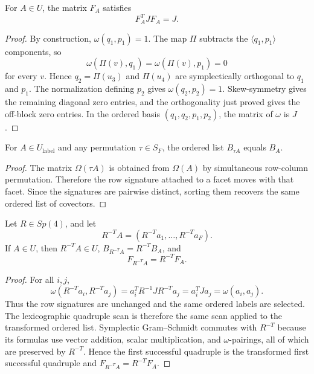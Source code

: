 \begin{lemma}
\label{lem:generic-coordinate-frame-symplectic}
For \(A\in U\), the matrix \(F_A\) satisfies
\[
  F_A^TJF_A=J.
\]
\end{lemma}

\begin{proof}
By construction, \(\omega(q_1,p_1)=1\). The map \(\Pi\) subtracts the
\(\langle q_1,p_1\rangle\) components, so
\[
  \omega(\Pi(v),q_1)=\omega(\Pi(v),p_1)=0
\]
for every \(v\). Hence \(q_2=\Pi(u_3)\) and \(\Pi(u_4)\) are symplectically
orthogonal to \(q_1\) and \(p_1\). The normalization defining \(p_2\) gives
\(\omega(q_2,p_2)=1\). Skew-symmetry gives the remaining diagonal zero entries,
and the orthogonality just proved gives the off-block zero entries. In the
ordered basis \((q_1,q_2,p_1,p_2)\), the matrix of \(\omega\) is \(J\).
\end{proof}

\begin{lemma}
\label{lem:generic-coordinate-labeling-permutation-equivariant}
For \(A\in U_{\mathrm{label}}\) and any permutation \(\tau\in S_F\), the ordered
list \(B_{\tau A}\) equals \(B_A\).
\end{lemma}

\begin{proof}
The matrix \(\Omega(\tau A)\) is obtained from \(\Omega(A)\) by simultaneous
row-column permutation. Therefore the row signature attached to a facet moves
with that facet. Since the signatures are pairwise distinct, sorting them
recovers the same ordered list of covectors.
\end{proof}

\begin{lemma}
\label{lem:generic-coordinate-frame-symplectic-equivariant}
Let \(R\in Sp(4)\), and let
\[
  R^{-T}A=(R^{-T}a_1,\ldots,R^{-T}a_F).
\]
If \(A\in U\), then \(R^{-T}A\in U\), \(B_{R^{-T}A}=R^{-T}B_A\), and
\[
  F_{R^{-T}A}=R^{-T}F_A.
\]
\end{lemma}

\begin{proof}
For all \(i,j\),
\[
  \omega(R^{-T}a_i,R^{-T}a_j)
  =a_i^T R^{-1}JR^{-T}a_j
  =a_i^TJa_j
  =\omega(a_i,a_j).
\]
Thus the row signatures are unchanged and the same ordered labels are selected.
The lexicographic quadruple scan is therefore the same scan applied to the
transformed ordered list. Symplectic Gram--Schmidt commutes with \(R^{-T}\)
because its formulas use vector addition, scalar multiplication, and
\(\omega\)-pairings, all of which are preserved by \(R^{-T}\). Hence the first
successful quadruple is the transformed first successful quadruple and
\(F_{R^{-T}A}=R^{-T}F_A\).
\end{proof}

